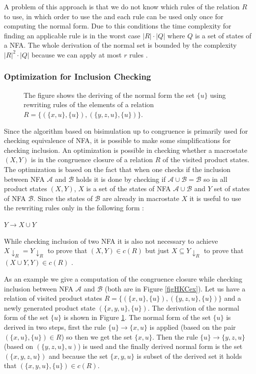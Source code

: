 A problem of this approach is that we do not know which rules of the relation $R$ to use, in which order to use the 
and each rule can be used only once for computing the normal form. 
Due to this conditions the time complexity for finding an applicable rule is in the worst case $|R|\cdot|Q|$ where $Q$ is a set of states of a NFA.
The whole derivation of the normal set is bounded by the complexity $|R|^2 \cdot |Q|$ because we can apply at most $r$ rules \cite{popl13}.

\subsubsection{Optimization for Inclusion Checking}
\label{congrOpt}
\begin{figure}[bt]
  \begin{center}
    
    \caption{The figure shows the deriving of the normal form the set $\{u\}$ using rewriting
      rules of the elements of a relation $R=\{(\{x,u\},\{u\}),(\{y,z,u\},\{u\})\}$.}
    \label{figHKCRewO}
  \end{center}
\end{figure}
Since the algorithm based on bisimulation up to congruence is primarily used for checking equivalence of NFA, it is possible to make some simplifications for
checking inclusion. An optimization is possible in checking whether a macrostate $(X,Y)$ is in the congruence closure of a relation $R$ of the visited
product states. The optimization
is based on the fact that when one checks if the inclusion between NFA $\mathcal{A}$ and $\mathcal{B}$ holds it is done by checking if $\mathcal{A}\cup\mathcal{B}=
\mathcal{B}$ so in all product states $(X,Y)$, $X$ is a set of the states of NFA $\mathcal{A}\cup\mathcal{B}$ and $Y$ set of states of NFA $\mathcal{B}$. Since the
states of $\mathcal{B}$ are already in macrostate $X$ it is useful to use the rewriting rules only in the following form \cite{popl13}:
\begin{center}
$Y\rightarrow X\cup Y$
\end{center}
While checking inclusion of two NFA it is also not necessary to achieve $X{\downarrow_R}=Y{\downarrow_R}$ to prove that $(X,Y)\in c(R)$ 
but just $X \subseteq Y{\downarrow_R}$ to prove that $(X\cup Y,Y)\in c(R)$ \cite{popl13}.

As an example we give a computation of the congruence closure while checking inclusion between NFA $\mathcal{A}$ and $\mathcal{B}$ (both are in Figure 
\ref{figHKCex}). Let us have a relation of visited product states $R=\{(\{x,u\},\{u\}),(\{y,z,u\},\{u\})\}$ and a 
newly generated product state $(\{x,y,u\},\{u\})$. The
derivation of the normal form of the set $\{u\}$ is shown in Figure \ref{figHKCRewO}. 
The normal form of the set $\{u\}$ is derived in two steps, first the rule $\{u\}\rightarrow\{x,u\}$ is applied (based on the pair $(\{x,u\},\{u\})\in R$) 
so then we get the set $\{x,u\}$. 
Then the rule $\{u\}\rightarrow\{y,z,u\}$ (based on $(\{y,z,u\},u)$) is used and the finally derived normal form is the set $(\{x,y,z,u\})$ 
and because the set $\{x,y,u\}$ is subset of the derived set it holds that $(\{x,y,u\},\{u\})\in c(R)$.


